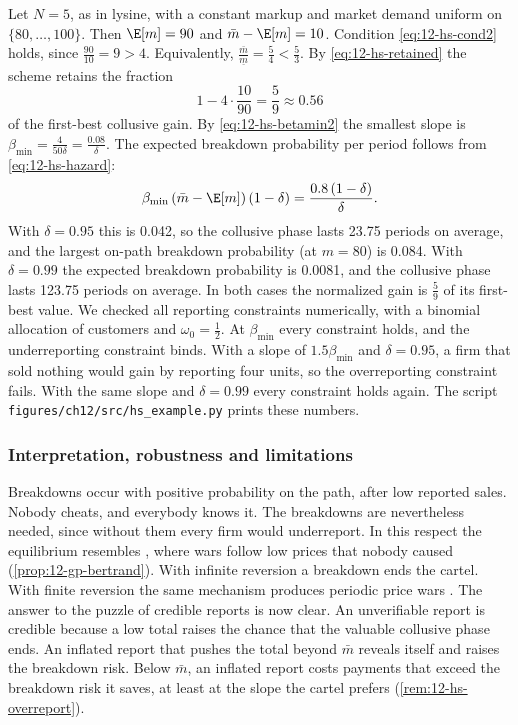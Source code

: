\begin{example}\label{ex:12-hs-numbers}
Let $N = 5$, as in lysine, with a constant markup and market demand uniform on $\{80, \dots, 100\}$. Then
$\E[m] = 90$ and $\bar m - \E[m] = 10$. Condition \eqref{eq:12-hs-cond2} holds, since $\frac{90}{10} = 9 > 4$.
Equivalently, $\frac{\bar m}{\underline m} = \frac{5}{4} < \frac{5}{3}$. By \eqref{eq:12-hs-retained} the scheme
retains the fraction
\begin{equation*}
  1 - 4\cdot\frac{10}{90} = \frac{5}{9} \approx 0.56
\end{equation*}
of the first-best collusive gain. By \eqref{eq:12-hs-betamin2} the smallest slope is
$\beta_{\min} = \frac{4}{50\delta} = \frac{0.08}{\delta}$. The expected breakdown probability per period follows
from \eqref{eq:12-hs-hazard}:
\begin{equation*}
  \beta_{\min}\,(\bar m - \E[m])\,(1 - \delta) = \frac{0.8\,(1-\delta)}{\delta} .
\end{equation*}
With $\delta = 0.95$ this is 0.042, so the collusive phase lasts 23.75 periods on average, and the largest
on-path breakdown probability (at $m = 80$) is 0.084. With $\delta = 0.99$ the expected breakdown probability
is 0.0081, and the collusive phase lasts 123.75 periods on average. In both cases the normalized gain is
$\frac{5}{9}$ of its first-best value. We checked all reporting constraints numerically, with a binomial
allocation of customers and $\omega_0 = \frac{1}{2}$. At $\beta_{\min}$ every constraint holds, and the
underreporting constraint binds. With a slope of $1.5\beta_{\min}$ and $\delta = 0.95$, a firm that sold nothing
would gain by reporting four units, so the overreporting constraint fails. With the same slope and
$\delta = 0.99$ every constraint holds again. The script \texttt{figures/ch12/src/hs\_example.py} prints these
numbers.
\end{example}

\subsubsection{Interpretation, robustness and limitations}

Breakdowns occur with positive probability on the path, after low reported sales. Nobody cheats, and everybody
knows it. The breakdowns are nevertheless needed, since without them every firm would underreport. In this
respect the equilibrium resembles \citet{GreenPorter1984}, where wars follow low prices that nobody caused
(\cref{prop:12-gp-bertrand}). With infinite reversion a breakdown ends the cartel. With finite reversion the same
mechanism produces periodic price wars \citep[footnote 15]{HarringtonSkrzypacz2011}. The answer to the puzzle of
credible reports is now clear. An unverifiable report is credible because a low total raises the chance that the
valuable collusive phase ends. An inflated report that pushes the total beyond $\bar m$ reveals itself and raises
the breakdown risk. Below $\bar m$, an inflated report costs payments that exceed the breakdown risk it saves, at
least at the slope the cartel prefers (\cref{rem:12-hs-overreport}).

